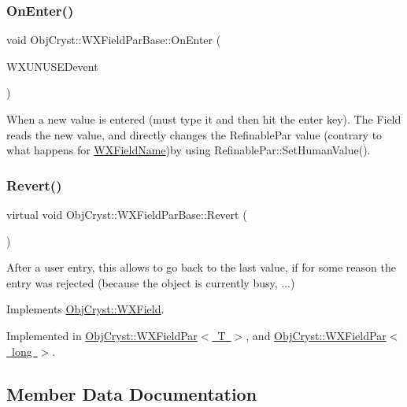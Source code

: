\subsubsection{\texorpdfstring{OnEnter()}{OnEnter()}}
{\footnotesize\ttfamily void Obj\+Cryst\+::\+W\+X\+Field\+Par\+Base\+::\+On\+Enter (\begin{DoxyParamCaption}\item[{wx\+Command\+Event \&}]{W\+X\+U\+N\+U\+S\+EDevent }\end{DoxyParamCaption})}

When a new value is entered (must type it and then hit the \textquotesingle{}enter\textquotesingle{} key). The Field reads the new value, and directly changes the Refinable\+Par value (contrary to what happens for \mbox{\hyperlink{class_obj_cryst_1_1_w_x_field_name}{W\+X\+Field\+Name}})by using Refinable\+Par\+::\+Set\+Human\+Value(). \mbox{\label{class_obj_cryst_1_1_w_x_field_par_base_a27fd5066d2f6b6e87e213439fd8f7311}} 
\subsubsection{\texorpdfstring{Revert()}{Revert()}}
{\footnotesize\ttfamily virtual void Obj\+Cryst\+::\+W\+X\+Field\+Par\+Base\+::\+Revert (\begin{DoxyParamCaption}{ }\end{DoxyParamCaption})\hspace{0.3cm}{\ttfamily [pure virtual]}}

After a user entry, this allows to go back to the last value, if for some reason the entry was rejected (because the object is currently busy, ...) 

Implements \mbox{\hyperlink{class_obj_cryst_1_1_w_x_field_a178d6d770d1e3adfa02e27da94b2dffa}{Obj\+Cryst\+::\+W\+X\+Field}}.



Implemented in \mbox{\hyperlink{class_obj_cryst_1_1_w_x_field_par_a928b1b8c7d47e3e99a29975c4dd51d58}{Obj\+Cryst\+::\+W\+X\+Field\+Par$<$ T $>$}}, and \mbox{\hyperlink{class_obj_cryst_1_1_w_x_field_par_a928b1b8c7d47e3e99a29975c4dd51d58}{Obj\+Cryst\+::\+W\+X\+Field\+Par$<$ long $>$}}.



\subsection{Member Data Documentation}
\mbox{\label{class_obj_cryst_1_1_w_x_field_par_base_a07aea47e860f14581b698ab91c7ac3f0}} 
